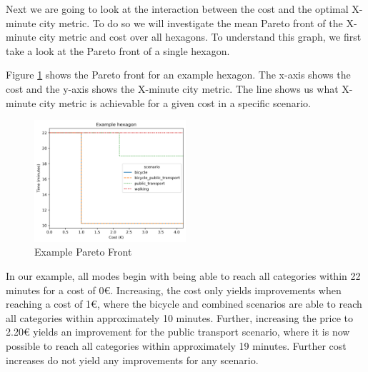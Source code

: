 Next we are going to look at the interaction between the cost and the optimal X-minute city metric.
To do so we will investigate the mean Pareto front of the X-minute city metric and cost over all hexagons.
To understand this graph, we first take a look at the Pareto front of a single hexagon.

Figure \ref{fig:example_pareto_front} shows the Pareto front for an example hexagon.
The x-axis shows the cost and the y-axis shows the X-minute city metric.
The line shows us what X-minute city metric is achievable for a given cost in a specific scenario.

\begin{figure}
  \begin{center}
     \includegraphics[width=0.5\textwidth]{Figures/results/metric_cost/example_profile}
  \end{center}
  \caption{Example Pareto Front}
  \label{fig:example_pareto_front}
\end{figure}

In our example, all modes begin with being able to reach all categories within 22 minutes for a cost of 0€.
Increasing, the cost only yields improvements when reaching a cost of 1€, where the bicycle and combined scenarios are able to reach all categories within approximately 10 minutes.
Further, increasing the price to 2.20€ yields an improvement for the public transport scenario, where it is now possible to reach all categories within approximately 19 minutes.
Further cost increases do not yield any improvements for any scenario.


